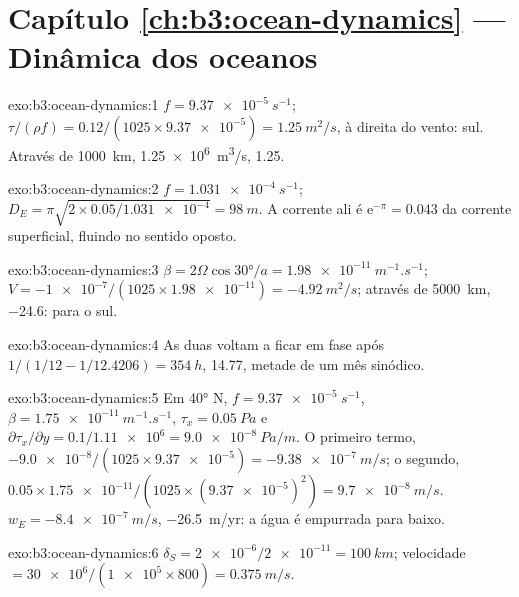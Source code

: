 \section*{Capítulo \ref{ch:b3:ocean-dynamics} --- Dinâmica dos oceanos}

\begin{solution}{exo:b3:ocean-dynamics:1}
$f = \qty{9.37e-5}{s^{-1}}$; $\tau/(\rho f) = 0.12/(1025\times\num{9.37e-5})
= \qty{1.25}{m^2/s}$, à direita do vento: sul. Através de
\qty{1000}{km}, \qty{1.25e6}{m^3/s}, \qty{1.25}{\sverdrup}.
\end{solution}

\begin{solution}{exo:b3:ocean-dynamics:2}
$f = \qty{1.031e-4}{s^{-1}}$; $D_E = \pi\sqrt{2\times0.05/\num{1.031e-4}}
= \qty{98}{m}$. A corrente ali é $\mathrm e^{-\pi} = \num{0.043}$ da
corrente superficial, fluindo no sentido oposto.
\end{solution}

\begin{solution}{exo:b3:ocean-dynamics:3}
$\beta = 2\Omega\cos\ang{30}/a = \qty{1.98e-11}{m^{-1}.s^{-1}}$; $V =
\num{-1e-7}/(1025\times\num{1.98e-11}) = \qty{-4.92}{m^2/s}$; através de
\qty{5000}{km}, \qty{-24.6}{\sverdrup}: para o sul.
\end{solution}

\begin{solution}{exo:b3:ocean-dynamics:4}
As duas  voltam a ficar em fase após $1/(1/12 - 1/12.4206) =
\qty{354}{h}$, \num{14.77}, metade de um mês sinódico.
\end{solution}

\begin{solution}{exo:b3:ocean-dynamics:5}
Em \ang{40} N, $f = \qty{9.37e-5}{s^{-1}}$, $\beta =
\qty{1.75e-11}{m^{-1}.s^{-1}}$, $\tau_x = \qty{0.05}{Pa}$ e
$\partial\tau_x/\partial y = 0.1/\num{1.11e6} = \qty{9.0e-8}{Pa/m}$. O
primeiro termo, $-\num{9.0e-8}/(1025\times\num{9.37e-5}) =
\qty{-9.38e-7}{m/s}$; o segundo, $0.05\times\num{1.75e-11}/(1025\times
(\num{9.37e-5})^2) = \qty{+9.7e-8}{m/s}$. $w_E = \qty{-8.4e-7}{m/s}$,
\qty{-26.5}{m/yr}: a água é empurrada para baixo.
\end{solution}

\begin{solution}{exo:b3:ocean-dynamics:6}
$\delta_S = \num{2e-6}/\num{2e-11} = \qty{100}{km}$; velocidade $=
\num{30e6}/(\num{1e5}\times800) = \qty{0.375}{m/s}$.
\end{solution}

